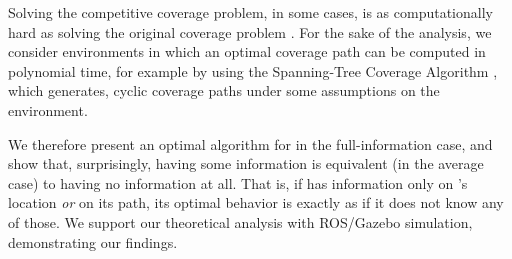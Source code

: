 Solving the competitive coverage problem, in some cases, is as computationally hard as solving the original coverage problem \cite{arkin2000approximation}. For the sake of the analysis, we consider environments in which an optimal coverage path can be computed in polynomial time, for example by using the Spanning-Tree Coverage Algorithm \cite{gabriely2001spanning}, which generates, cyclic coverage paths under some assumptions on the environment. 

We therefore present an optimal algorithm for \opp in the full-information case, and show that, surprisingly, having some information is equivalent (in the average case) to having no information at all. That is, if \rob has information only on \opp's location {\em or} on its path, its optimal behavior is exactly as if it does not know any of those. We support our theoretical analysis with ROS/Gazebo simulation, demonstrating our findings. 
